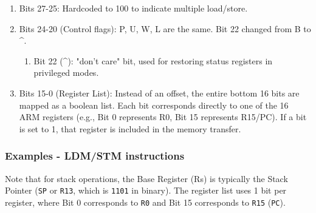 \documentclass[../comorg-part1.tex]{subfiles}
\begin{document}
\begin{enumerate}
    \item Bits 27-25: Hardcoded to 100 to indicate multiple load/store.
    \item Bits 24-20 (Control flags): P, U, W, L are the same. Bit 22 changed from B to \textasciicircum.
    \begin{enumerate}
        \item Bit 22 (\textasciicircum): "don't care" bit, used for restoring status registers in privileged modes.
    \end{enumerate}
    \item Bits 15-0 (Register List): Instead of an offset, the entire bottom 16 bits are mapped as a boolean list. Each bit corresponds directly to one of the 16 ARM registers (e.g., Bit 0 represents R0, Bit 15 represents R15/PC). If a bit is set to 1, that register is included in the memory transfer.
\end{enumerate}


        
        
        

\subsubsection{Examples - LDM/STM instructions}

Note that for stack operations, the Base Register (Rs) is typically the Stack Pointer (\texttt{SP} or \texttt{R13}, which is \texttt{1101} in binary). The register list uses 1 bit per register, where Bit 0 corresponds to \texttt{R0} and Bit 15 corresponds to \texttt{R15} (\texttt{PC}).
\end{document}
